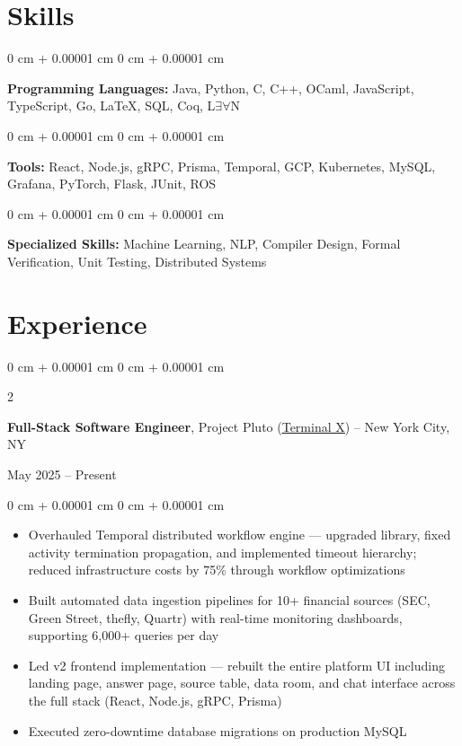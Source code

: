 \documentclass[10pt, letterpaper]{article}
\newenvironment{highlights}{
    \begin{itemize}[
        topsep=0.05 cm,
        parsep=0.05 cm,
        partopsep=0pt,
        itemsep=0pt,
        leftmargin=0 cm + 10pt
    ]
}{
    \end{itemize}
} %
\newenvironment{onecolentry}{
    \begin{adjustwidth}{
        0 cm + 0.00001 cm
    }{
        0 cm + 0.00001 cm
    }
}{
    \end{adjustwidth}
} %
\newenvironment{twocolentry}[2][]{
    \onecolentry
    \def\secondColumn{#2}
    \setcolumnwidth{\fill, 4.5 cm}
    \begin{paracol}{2}
}{
    \switchcolumn \raggedleft \secondColumn
    \end{paracol}
    \endonecolentry
} %
\let\hrefWithoutArrow\href
\begin{document}
    \section{Skills}

        \begin{onecolentry}
            \textbf{Programming Languages:}  Java, Python, C, C++, OCaml, JavaScript, TypeScript, Go, \LaTeX, SQL, Coq, L$\exists\forall$N
        \end{onecolentry}
        \vspace{0.08 cm}
        \begin{onecolentry}
            \textbf{Tools:} React, Node.js, gRPC, Prisma, Temporal, GCP, Kubernetes, MySQL, Grafana, PyTorch, Flask, JUnit, ROS
        \end{onecolentry}
        \vspace{0.08 cm}
        \begin{onecolentry}
            \textbf{Specialized Skills:} Machine Learning, NLP, Compiler Design, Formal Verification, Unit Testing, Distributed Systems
        \end{onecolentry}
    \section{Experience}
        \begin{twocolentry}
            {May 2025 – Present}
            \textbf{Full-Stack Software Engineer}, Project Pluto (\hrefWithoutArrow{https://terminal-x.ai}{\color{blue}\underline{Terminal X}}) -- New York City, NY
        \end{twocolentry}

        \vspace{0.10 cm}
        \begin{onecolentry}
            \begin{highlights}
                \item Overhauled Temporal distributed workflow engine — upgraded library, fixed activity termination propagation, and implemented timeout hierarchy; reduced infrastructure costs by 75\% through workflow optimizations
                \item Built automated data ingestion pipelines for 10+ financial sources (SEC, Green Street, thefly, Quartr) with real-time monitoring dashboards, supporting 6,000+ queries per day
                \item Led v2 frontend implementation — rebuilt the entire platform UI including landing page, answer page, source table, data room, and chat interface across the full stack (React, Node.js, gRPC, Prisma)
                \item Executed zero-downtime database migrations on production MySQL
            \end{highlights}
        \end{onecolentry}
        \vspace{0.2 cm}
\end{document}
